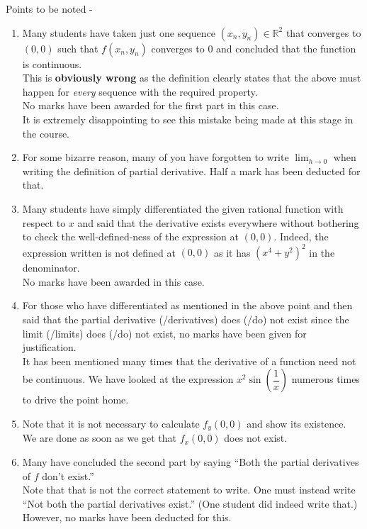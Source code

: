 \documentclass{article}
\begin{document}
\vspace{0.2 cm}

Points to be noted -
\begin{enumerate} 
	\item Many students have taken just one sequence $(x_n, y_n) \in \mathbb{R}^2$ that converges to $(0,0)$ such that $f(x_n, y_n)$ converges to $0$ and concluded that the function is continuous.\\
	This is \textbf{obviously wrong} as the definition clearly states that the above must happen for \emph{every} sequence with the required property. \\
	No marks have been awarded for the first part in this case. \\
	It is extremely disappointing to see this mistake being made at this stage in the course.
	\item For some bizarre reason, many of you have forgotten to write $\displaystyle\lim_{h\to 0}$ when writing the definition of partial derivative. Half a mark has been deducted for that.
	\item Many students have simply differentiated the given rational function with respect to $x$ and said that the derivative exists everywhere without bothering to check the well-defined-ness of the expression at $(0,0).$ Indeed, the expression written is not defined at $(0,0)$ as it has $(x^4 + y^2)^2$ in the denominator.\\
	No marks have been awarded in this case.
	\item For those who have differentiated as mentioned in the above point and then said that the partial derivative (/derivatives) does (/do) not exist since the limit (/limits) does (/do) not exist, no marks have been given for justification.\\
	It has been mentioned many times that the derivative of a function need not be continuous. We have looked at the expression $x^2\sin\left(\dfrac{1}{x}\right)$ numerous times to drive the point home.
	\item Note that it is not necessary to calculate $f_y(0,0)$ and show its existence. We are done as soon as we get that $f_x(0,0)$ does not exist.
	\item Many have concluded the second part by saying ``Both the partial derivatives of $f$ don't exist.''\\
	Note that that is not the correct statement to write. One must instead write ``Not both the partial derivatives exist.'' (One student did indeed write that.)\\
	However, no marks have been deducted for this.
\end{enumerate}
\end{document}
